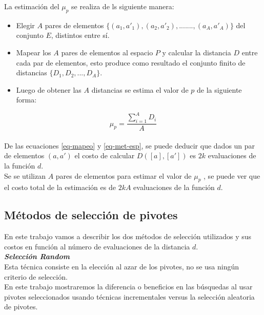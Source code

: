 \noindent La estimaci\'on del $\mu_p$ se realiza de ls siguiente manera:

\begin{itemize}

\item Elegir $A$ pares de elementos $\{(a_1,a'_1),(a_2,a'_2),.......,(a_A,a'_A)\}$ del conjunto $E$, distintos entre s\'i.

\item Mapear los $A$ pares de elementos al espacio $P$ y calcular la distancia $D$ entre cada par de elementos, esto produce como resultado el conjunto finito de distancias $\{D_1,D_2,...,D_A\}$.
  
\item Luego de obtener las $A$ distancias se estima el valor de $p$ de la siguiente forma:
\end{itemize}
\begin{equation}
\mu_p = \frac{\sum_{i=1}^A D_i}{A}
\end{equation}
\\
De las ecuaciones \ref{eq-mapeo} y \ref{eq-met-esp}, se puede deducir que dados un par de elementos $(a,a')$ el costo de calcular $D([a],[a'])$ es $2k$ evaluaciones de la funci\'on $d$.\\

Se se utilizan $A$ pares de elementos para estimar el valor de $\mu_p$ , se puede ver que el costo total de la estimaci\'on es de $2kA$ evaluaciones de la funci\'on $d$.\\

\subsection{M\'etodos de selecci\'on de pivotes}

En este trabajo vamos a describir los dos m\'etodos de selecci\'on utilizados y sus costos en funci\'on al n\'umero de evaluaciones de la distancia $d$.\\

\noindent \textit{\textbf{Selecci\'on Random}}\\

Esta t\'ecnica consiste en la elecci\'on al azar de los pivotes, no se usa ning\'un criterio de selecci\'on.\\

En este trabajo mostraremos la diferencia o beneficios en las b\'usquedas al usar pivotes seleccionados usando t\'ecnicas incrementales versus la selecci\'on aleatoria de pivotes.\\

